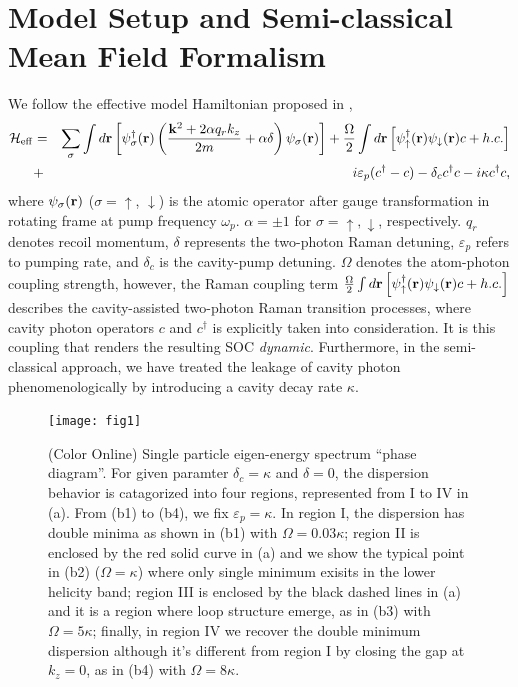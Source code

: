 \documentclass[atoms,article,submit,moreauthors,pdftex,12pt,a4paper]{mdpi}
\def\ba{\begin{eqnarray}}
\def\ea{\end{eqnarray}}
\begin{document}
\section{Model Setup and Semi-classical Mean Field Formalism} \label{meanfield}

We follow the effective model Hamiltonian proposed in \cite{cavitySOC}, 
\ba
 \mathcal{H}_{\rm eff}& = & \sum_\sigma\int d{\bf r}\left[ \psi^\dagger_\sigma({\bf r})\left(\frac{ {\bf k}^2+ 2\alpha q_r {k}_z}{2m}+\alpha\delta\right)\psi_\sigma({\bf r})\right]+  \frac{\Omega}{2}\int d{\bf r}\left[{\psi}_{\uparrow}^{\dagger}({\bf r}){\psi}_{\downarrow}({\bf r})c+ h.c. \right]\nonumber \\
 & + & i\varepsilon_{p}(c^{\dagger}-c)-\delta_c c^{\dagger}c-i\kappa c^{\dagger}c, \label{effH}
 \ea
where $\psi_\sigma({\bf r})$ ($\sigma = \uparrow$, $\downarrow$) is the atomic operator after gauge transformation in rotating frame at pump frequency $\omega_p$. $\alpha=\pm 1$ for $\sigma=\uparrow,\downarrow$, respectively. $q_r$ denotes recoil momentum, $\delta$ represents the two-photon Raman detuning, $\varepsilon_p$ refers to pumping rate, and $\delta_c$ is the cavity-pump detuning. $\Omega$ denotes the atom-photon coupling strength, however, the Raman coupling term $ \frac{\Omega}{2}\int d{\bf r}\left[\psi_{\uparrow}^{\dagger}({\bf r})\psi_{\downarrow}({\bf r})c+h.c.\right]$ describes the cavity-assisted two-photon Raman transition processes, where cavity photon operators $c$ and $c^\dag$ is explicitly taken into consideration. It is this coupling that renders the resulting SOC \emph{dynamic}. Furthermore, in the semi-classical approach, we have treated the leakage of cavity photon phenomenologically by introducing a cavity decay rate $\kappa$. 

\begin{figure}[htp]
\texttt{[image: fig1]}\caption{ (Color Online) Single particle eigen-energy spectrum ``phase diagram''. For given paramter $\delta_c=\kappa$ and $\delta=0$, the dispersion behavior is catagorized into four regions, represented from I to IV in (a). From (b1) to (b4), we fix $\varepsilon_p=\kappa$. In region I, the dispersion has double minima as shown in (b1) with $\Omega=0.03\kappa$; region II is enclosed by the red solid curve in (a) and we show the typical point in (b2) ($\Omega=\kappa$) where only single minimum exisits in the lower helicity band; region III is enclosed by the black dashed lines in (a) and it is a region where loop structure emerge, as in (b3) with $\Omega=5\kappa$; finally, in region IV we recover the double minimum dispersion although it's different from region I by closing the gap at $k_z=0$, as in (b4) with $\Omega=8\kappa$.}\label{fig1}
\end{figure}
\end{document}
